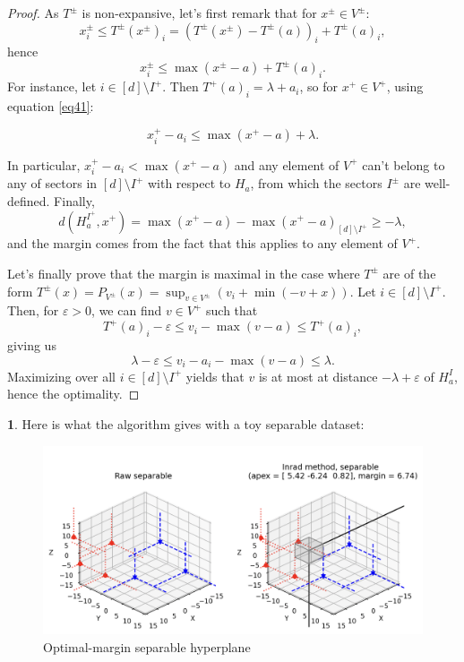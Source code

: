 \documentclass[oneside,english]{amsart}
\numberwithin{equation}{section}
\numberwithin{figure}{section}
\theoremstyle{plain}
\theoremstyle{definition}
\theoremstyle{plain}
\theoremstyle{remark}
\theoremstyle{plain}
\theoremstyle{definition}
\newtheorem{example}[thm]{\protect\examplename}
\theoremstyle{definition}
\providecommand{\examplename}{Example}
\begin{document}
\begin{proof}
As $T^{\pm}$ is non-expansive, let's first remark that for $x^{\pm}\in V^{\pm}$:
\[
x_{i}^{\pm}\le T^{\pm}(x^{\pm})_{i}=\left(T^{\pm}(x^{\pm})-T^{\pm}(a)\right)_{i}+T^{\pm}(a)_{i},
\]
hence 
\begin{equation}
x_{i}^{\pm}\le\max(x^{\pm}-a)+T^{\pm}(a)_{i}.\label{eq41}
\end{equation}
For instance, let $i\in[d]\setminus I^{+}$. Then $T^{+}(a)_{i}=\lambda+a_{i}$,
so for $x^{+}\in V^{+}$, using equation \ref{eq41}:

\[
x_{i}^{+}-a_{i}\le\max(x^{+}-a)+\lambda.
\]

In particular, $x_{i}^{+}-a_{i}<\max(x^{+}-a)$ and any element of
$V^{+}$ can't belong to any of sectors in $[d]\setminus I^{+}$ with
respect to $H_{a}$, from which the sectors $I^{\pm}$ are well-defined.
Finally, 
\[
d(H_{a}^{I^{+}},x^{+})=\max(x^{+}-a)-\max(x^{+}-a)_{[d]\setminus I^{+}}\ge-\lambda,
\]
and the margin comes from the fact that this applies to any element
of $V^{+}$.

Let's finally prove that the margin is maximal in the case where $T^{\pm}$
are of the form $T^{\pm}(x)=P_{V^{\pm}}(x)=\sup_{v\in V^{\pm}}\left(v_{i}+\min(-v+x)\right).$
Let $i\in[d]\setminus I^{+}$. Then, for $\varepsilon>0$, we can
find $v\in V^{+}$ such that 
\[
T^{+}(a)_{i}-\varepsilon\le v_{i}-\max(v-a)\le T^{+}(a)_{i},
\]
giving us 
\[
\lambda-\varepsilon\le v_{i}-a_{i}-\max(v-a)\le\lambda.
\]
Maximizing over all $i\in[d]\setminus I^{+}$ yields that $v$ is
at most at distance $-\lambda+\varepsilon$ of $H_{a}^{I}$, hence
the optimality.
\end{proof}
\begin{example}
Here is what the algorithm gives with a toy separable dataset:

\begin{figure}[!h]
\includegraphics[scale=0.45]{fig/separable} \caption{Optimal-margin separable hyperplane}
\end{figure}
\end{example}
\end{document}
